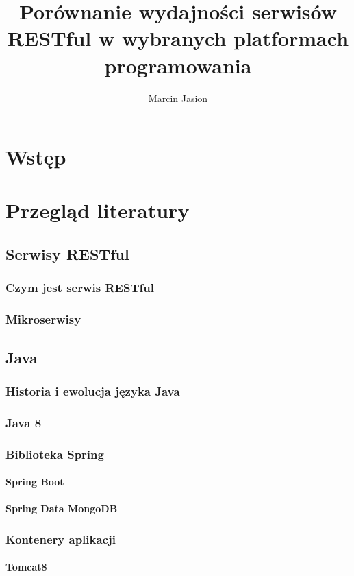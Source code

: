 \documentclass[a4paper,12pt,twoside,openany]{report}
\title{Porównanie wydajności serwisów RESTful w wybranych platformach programowania}
\author{Marcin Jasion}
\begin{document}
\maketitle

\chapter{Wstęp}

\chapter{Przegląd literatury}
\section{Serwisy RESTful}
\subsection{Czym jest serwis RESTful}
\subsection{Mikroserwisy}

\section{Java}
\subsection{Historia i ewolucja języka Java}
\subsection{Java 8}
\subsection{Biblioteka Spring}
\subsubsection{Spring Boot}
\subsubsection{Spring Data MongoDB}
\subsection{Kontenery aplikacji}
\subsubsection{Tomcat8}
\end{document}
